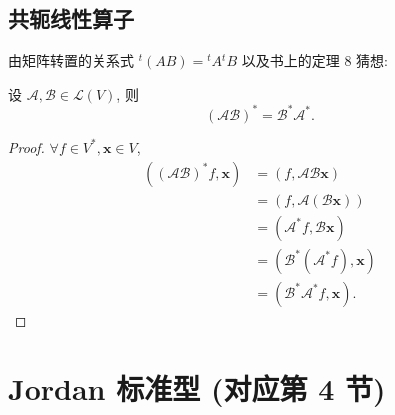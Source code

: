 \documentclass{ctexart}
\begin{document}
\subsection{共轭线性算子}
由矩阵转置的关系式 ${}^t(AB)={}^tA{}^tB$ 以及书上的定理 8 猜想:
\begin{theorem}
    设 $\mathcal{A},\mathcal{B}\in\mathcal{L}(V)$, 则
    \[(\mathcal{AB})^*=\mathcal{B}^*\mathcal{A}^*.\]
\end{theorem}
\begin{proof}
    $\forall f\in V^*,\boldsymbol{x}\in V$,
    \begin{align*}
        ((\mathcal{AB})^*f,\boldsymbol{x}) & =(f,\mathcal{AB}\boldsymbol{x}) \\
        & =(f,\mathcal{A}(\mathcal{B}\boldsymbol{x})) \\
        & =(\mathcal{A}^*f,\mathcal{B}\boldsymbol{x}) \\
        & =(\mathcal{B}^*(\mathcal{A}^*f),\boldsymbol{x}) \\
        & =(\mathcal{B}^*\mathcal{A}^*f,\boldsymbol{x}).
    \end{align*}
\end{proof}
\section{Jordan 标准型 (对应第 4 节)}
\end{document}
